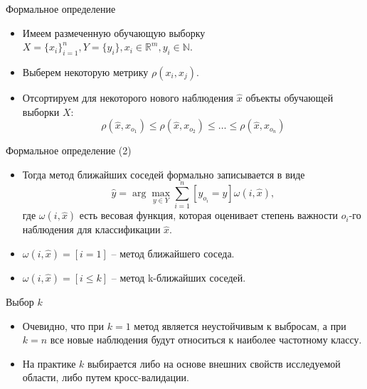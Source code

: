 \documentclass{beamer}
\begin{document}
\begin{frame}{Формальное определение}
    \small
    \begin{itemize}
         \item Имеем размеченную обучающую выборку $X = \{ x_i\}_{i=1}^n, Y = \{ y_i \}, x_i \in \mathbb{R}^m, y_i \in \mathbb{N}$.
         \item Выберем некоторую метрику $\rho(x_i, x_j)$.
         \item Отсортируем для некоторого нового наблюдения $\widehat x$ объекты обучающей выборки $X$:
         $$\rho(\widehat x, x_{o_1}) \leqslant \rho(\widehat x, x_{o_2}) \leqslant \ldots \leqslant \rho(\widehat x, x_{o_n})$$
    \end{itemize}
\end{frame}

\begin{frame}{Формальное определение (2)}
    \small
    \begin{itemize}
        \item Тогда метод ближайших соседей формально записывается в виде
         $$\widehat y = \arg \max_{y \in Y} \sum_{i=1}^n \left [ y_{o_i} = y \right ] \omega(i, \widehat x),$$
         где $\omega(i, \widehat x)$ есть весовая функция, которая оценивает степень важности $o_i$-го наблюдения для классификации $\widehat x$.
        \item $\omega(i, \widehat x) = [ i = 1 ]$ -- метод ближайшего соседа.
        \item $\omega(i, \widehat x) = [ i \leqslant k ]$ -- метод k-ближайших соседей.
    \end{itemize}
    
\end{frame}

\begin{frame}{Выбор $k$}
    \small
    \begin{itemize}
        \item Очевидно, что при $k = 1$ метод является неустойчивым к выбросам, а при $k = n$ все новые наблюдения будут относиться к наиболее частотному классу.
        \item На практике $k$ выбирается либо на основе внешних свойств исследуемой области, либо путем кросс-валидации.
    \end{itemize}
\end{frame}
\end{document}
